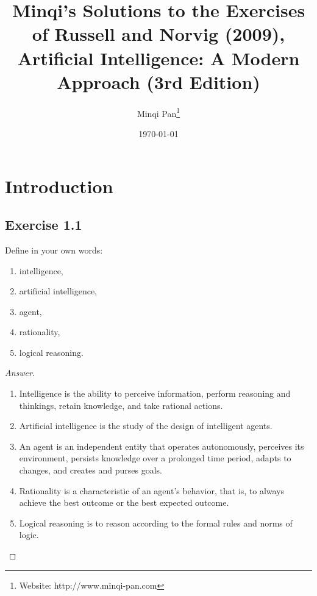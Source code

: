 \documentclass{amsbook}
\theoremstyle{definition}
\theoremstyle{remark}
\numberwithin{section}{chapter}
\numberwithin{equation}{chapter}
\begin{document}
\frontmatter

\title{Minqi's Solutions to the Exercises of Russell and Norvig (2009), Artificial Intelligence: A Modern Approach (3rd Edition)}

\author{Minqi Pan\footnote{Website: http://www.minqi-pan.com}}

\date{\today}

\maketitle

\setcounter{page}{4}

\tableofcontents

\mainmatter

\chapter{Introduction}

\section{Exercise 1.1}
Define in your own words:
\begin{enumerate}[label=(\alph*)]
\item intelligence,
\item artificial intelligence,
\item agent,
\item rationality,
\item logical reasoning.
\end{enumerate}
\begin{proof}[Answer]
\begin{enumerate}[label=(\alph*)]
\item Intelligence is the ability to perceive information, perform reasoning and thinkings, retain knowledge, and take rational actions.
\item Artificial intelligence is the study of the design of intelligent agents.
\item An agent is an independent entity that operates autonomously, perceives its environment, persists knowledge over a prolonged time period, adapts to changes, and creates and purses goals.
\item Rationality is a characteristic of an agent's behavior, that is, to always achieve the best outcome or the best expected outcome.
\item Logical reasoning is to reason according to the formal rules and norms of logic.
\end{enumerate}
\end{proof}
\end{document}
